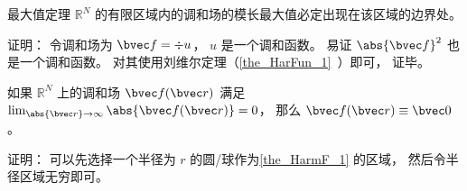 \begin{theorem}{最大值定理}\label{the_HarmF_1}
$\mathbb R^N$ 的有限区域内的调和场的模长最大值必定出现在该区域的边界处。
\end{theorem}
证明： 令调和场为 $\bvec f = \div u$， $u$ 是一个调和函数。 易证 $\abs{\bvec f}^2$ 也是一个调和函数。 对其使用刘维尔定理（\autoref{the_HarFun_1}~）即可， 证毕。

\begin{corollary}{}\label{cor_HarmF_1}
如果 $\mathbb R^N$ 上的调和场 $\bvec f(\bvec r)$ 满足 $\lim_{\abs{\bvec r}\to \infty} \abs{\bvec f(\bvec r)}  = 0$， 那么 $\bvec f(\bvec r) \equiv \bvec 0$。
\end{corollary}
证明： 可以先选择一个半径为 $r$ 的圆/球作为\autoref{the_HarmF_1} 的区域， 然后令半径区域无穷即可。
